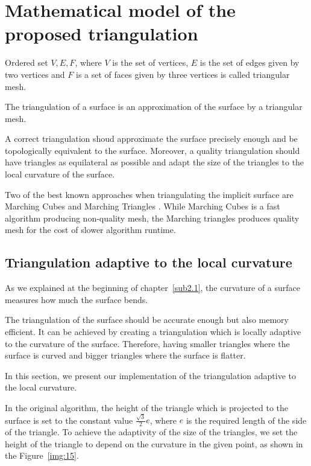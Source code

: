 \chapter{Mathematical model of the proposed triangulation}
\label{chap2}

Ordered set $V, E, F$, where $V$ is the set of vertices, $E$ is the set of edges given
by two vertices and $F$ is a set of faces given by three vertices is called triangular
mesh.

The triangulation of a surface is an approximation of the surface by a triangular mesh.

A correct triangulation shoud approximate the surface precisely enough and
be topologically equivalent to the surface. Moreover, a quality triangulation
should have triangles as equilateral as possible and adapt the size of the triangles
to the local curvature of the surface.

Two of the best known approaches when triangulating the implicit surface are
Marching Cubes \cite{lorensen1987marching} and Marching Triangles \cite{hilton1996marching}.
While Marching Cubes is a fast algorithm producing non-quality mesh, the Marching triangles
produces quality mesh for the cost of slower algorithm runtime.



\section{Triangulation adaptive to the local curvature}
\label{sub3.1}

As we explained at the beginning of chapter~\ref{sub2.1}, the curvature of a surface
measures how much the surface bends.

The triangulation of the surface should be accurate enough but also memory efficient.
It can be achieved by creating a triangulation which is locally adaptive to the
curvature of the surface. Therefore, having smaller triangles where
the surface is curved and bigger triangles where the surface is flatter.

In this section, we present our implementation of the triangulation adaptive
to the local curvature.

In the original algorithm, the height of the triangle which is projected
to the surface is set to the constant value $\frac{\sqrt{3}}{2}e$, where $e$ 
is the required length of the side of the triangle. To achieve the adaptivity
of the size of the triangles, we set the height of the triangle to depend on the curvature in
the given point, as shown in the Figure~\ref{img:15}.

